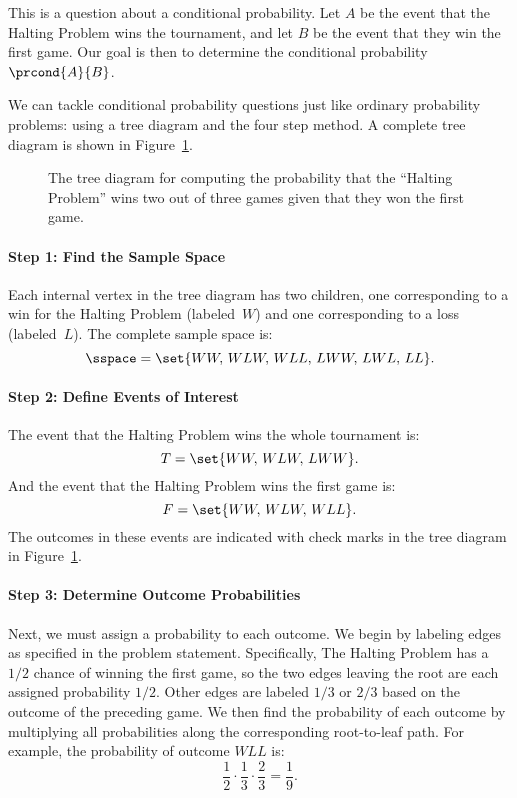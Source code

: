 This is a question about a conditional probability.  Let $A$ be the
event that the Halting Problem wins the tournament, and let $B$ be the
event that they win the first game.  Our goal is then to determine the
conditional probability $\prcond{A}{B}$.

We can tackle conditional probability questions just like ordinary
probability problems: using a tree diagram and the four step method.
A complete tree diagram is shown in Figure~\ref{fig:15B2}.

\begin{figure}[h]


\caption{The tree diagram for computing the probability that the
  ``Halting Problem'' wins two out of three games given that they won
  the first game.}

\label{fig:15B2}

\end{figure}

\paragraph{Step 1:  Find the Sample Space}

Each internal vertex in the tree diagram has two children, one
corresponding to a win for the Halting Problem (labeled~$W$) and one
corresponding to a loss (labeled~$L$).  The complete sample space is:
%
\[
    \sspace = \set{ WW, \, WLW,\, WLL,\, LWW,\, LWL,\, LL }.
\]

\paragraph{Step 2:  Define Events of Interest}

The event that the Halting Problem wins the whole tournament is:
%
\[
    T = \set{WW,\, WLW,\, LWW}.
\]
%
And the event that the Halting Problem wins the first game is:
%
\[
    F = \set{WW,\, WLW,\, WLL }.
\]
%
The outcomes in these events are indicated with check marks in the tree
diagram in Figure~\ref{fig:15B2}.

\paragraph{Step 3:  Determine Outcome Probabilities}

Next, we must assign a probability to each outcome.  We begin by
labeling edges as specified in the problem statement.  Specifically,
The Halting Problem has a $1/2$ chance of winning the first game, so
the two edges leaving the root are each assigned probability $1/2$.
Other edges are labeled $1/3$ or $2/3$ based on the outcome of the
preceding game.  We then find the probability of each outcome by
multiplying all probabilities along the corresponding root-to-leaf
path.  For example, the probability of outcome $WLL$ is:
%
\[
    \frac{1}{2} \cdot \frac{1}{3} \cdot \frac{2}{3} = \frac{1}{9}.
\]

